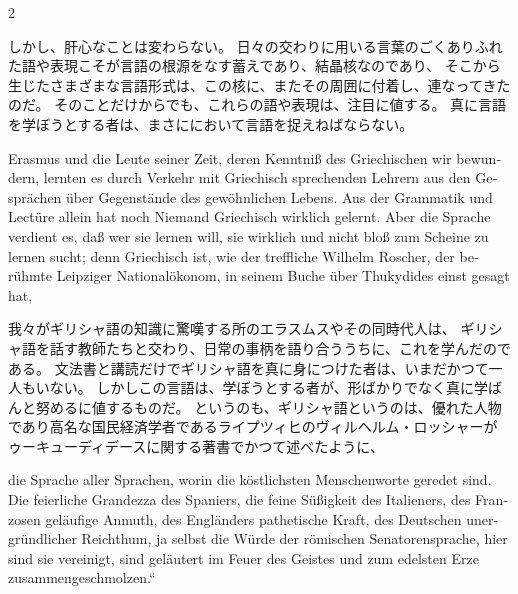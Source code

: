 \begin{paracol}{2}
\begin{japanese}
しかし、肝心なことは変わらない。
日々の交わりに用いる言葉のごくありふれた語や表現こそが言語の根源をなす蓄えであり、結晶核なのであり、
そこから生じたさまざまな言語形式は、この核に、またその周囲に付着し、連なってきたのだ。
そのことだけからでも、これらの語や表現は、注目に値する。
真に言語を学ぼうとする者は、まさに\emph{}において言語を捉えねばならない。
\end{japanese}
\switchcolumn*

\begin{german}
Eras\textcompwordmark{}mus und die Leute seiner Zeit, deren Kenntniß
des Griechischen wir bewundern, lernten es durch Ver\textcompwordmark{}kehr
mit Griechisch sprechenden Lehrern aus den Gesprächen über Gegenstände
des gewöhnlichen Lebens. Aus der Grammatik und Lectüre allein hat
noch Niemand Griechisch wirklich gelernt. Aber die Sprache verdient
es, daß wer sie lernen will, sie wirklich und nicht bloß zum Scheine
zu lernen sucht; denn Griechisch ist, wie der treffliche Wilhelm
Roscher, der berühmte Leipziger Nationalökonom, in seinem Buche über
Thukydides einst gesagt hat,
\end{german}
\switchcolumn

\begin{japanese}
我々がギリシャ語の知識に驚嘆する所のエラスムスやその同時代人は、
ギリシャ語を話す教師たちと交わり、日常の事柄を語り合ううちに、これを学んだのである。
文法書と講読だけでギリシャ語を真に身につけた者は、いまだかつて一人もいない。
しかしこの言語は、学ぼうとする者が、形ばかりでなく真に学ばんと努めるに値するものだ。
というのも、ギリシャ語というのは、優れた人物であり高名な国民経済学者であるライプツィヒのヴィルヘルム・ロッシャーが
ゥーキューディデースに関する著書でかつて述べたように、
\end{japanese}
\switchcolumn*

\begin{german}
\begin{quotedquotation}\noindent die Sprache aller Sprachen, worin
die köstlichsten Menschenworte geredet sind. Die feierliche Grandezza
des Spaniers, die feine Süßigkeit des Italieners, des Franzosen geläufige
Anmuth, des Engländers pathetische Kraft, des Deutschen unergründlicher
Reichthum, ja selbst die Würde der römischen Senatorensprache, hier
sind sie vereinigt, sind geläutert im Feuer des Geistes und zum edelsten
Erze zusammengeschmolzen.\unskip``\end{quotedquotation}
\end{german}
\switchcolumn


\end{paracol}
